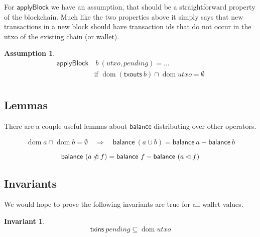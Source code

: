 \documentclass{article}
\newcommand{\restrictdom}{\lhd}
\newcommand{\subtractdom}{\mathbin{\slashed{\restrictdom}}}
\DeclareMathOperator{\dom}{dom}
\newtheorem{invariant}{Invariant}
\newtheorem{assumption}{Assumption}
\begin{document}
For $\mathsf{applyBlock}$ we have an assumption, that should be a
straightforward property of the blockchain. Much like the two properties above
it simply says that new transactions in a new block should have transaction
ids that do not occur in the utxo of the existing chain (or wallet).

\begin{assumption}
\begin{equation*}
\begin{split}
\mathsf{applyBlock} & ~ b ~ (utxo, pending) = \ldots \\
& \text{if } \dom (\mathsf{txouts} ~ b) \cap \dom utxo = \emptyset \\
\end{split}
\end{equation*}
\label{applyBlock_assumption}
\end{assumption}


\subsection{Lemmas}

There are a couple useful lemmas about $\mathsf{balance}$ distributing over
other operators.

\begin{equation} \label{lemma_balance_minus}
  \dom a \cap \dom b = \emptyset \quad \Longrightarrow \quad
  \mathsf{balance} ~ (a \cup b) = \mathsf{balance} ~ a + \mathsf{balance} ~ b
\end{equation}

\begin{equation} \label{lemma_balance_union}
  \mathsf{balance} ~ (a \subtractdom f) = \mathsf{balance} ~ f - \mathsf{balance} ~ (a \restrictdom f) \\
\end{equation}


\subsection{Invariants}
\label{sec:invariants}

We would hope to prove the following invariants are true for all wallet values.

\begin{invariant}
\begin{equation*}
\mathsf{txins} ~ pending \subseteq \dom utxo
\end{equation*}
\label{inv:txins_in_dom_utxo}
\end{invariant}
\end{document}
